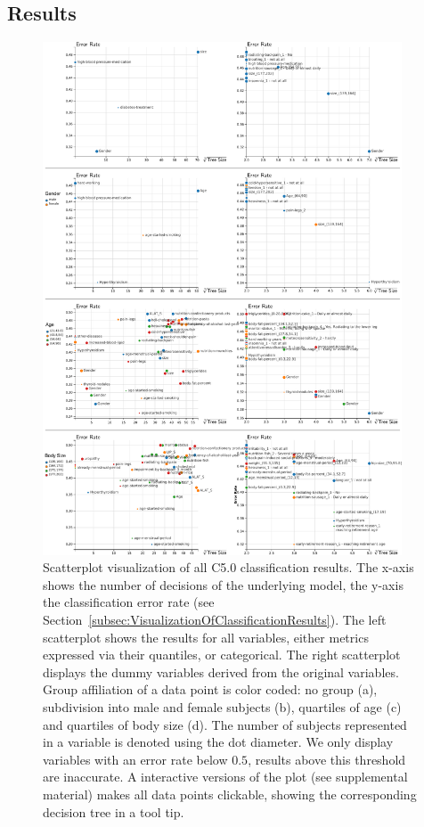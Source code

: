 \documentclass[a4paper,twoside]{style/article}
\begin{document}
\subsection{Results}
\begin{figure}[p!]
  \centering
  \includegraphics[width=0.95\textwidth]{figures/results}
  \caption{
Scatterplot visualization of all C5.0 classification results.
The x-axis shows the number of decisions of the underlying model, the y-axis the classification error rate (see Section~\ref{subsec:VisualizationOfClassificationResults}).
The left scatterplot shows the results for all variables, either metrics expressed via their quantiles, or categorical.
The right scatterplot displays the dummy variables derived from the original variables.
Group affiliation of a data point is color coded:
no group (a), subdivision into male and female subjects (b), quartiles of age (c) and quartiles of body size (d).
The number of subjects represented in a variable is denoted using the dot diameter.
We only display variables with an error rate below $0.5$, results above this threshold are inaccurate.
A interactive versions of the plot (see supplemental material) makes all data points clickable, showing the corresponding decision tree in a tool tip.
}
  \label{fig:results}
\end{figure}
\end{document}
